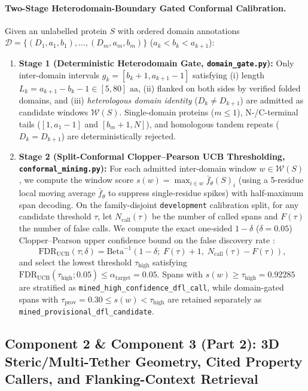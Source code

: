 \documentclass[11pt]{article}
\begin{document}
\paragraph{Two-Stage Heterodomain-Boundary Gated Conformal Calibration.}
Given an unlabelled protein $S$ with ordered domain annotations $\mathcal{D} = \{(D_1, a_1, b_1), \dots, (D_m, a_m, b_m)\}$ ($a_k < b_k < a_{k+1}$):
\begin{enumerate}
  \item \textbf{Stage 1 (Deterministic Heterodomain Gate, \texttt{domain\_gate.py}):} Only inter-domain intervals $g_k = [b_k + 1, a_{k+1} - 1]$ satisfying (i) length $L_k = a_{k+1} - b_k - 1 \in [5, 80]\text{ aa}$, (ii) flanked on both sides by verified folded domains, and (iii) \emph{heterologous domain identity} ($D_k \neq D_{k+1}$) are admitted as candidate windows $\mathcal{W}(S)$. Single-domain proteins ($m \le 1$), N-/C-terminal tails ($[1, a_1-1]$ and $[b_m+1, N]$), and homologous tandem repeats ($D_k = D_{k+1}$) are deterministically rejected.
  \item \textbf{Stage 2 (Split-Conformal Clopper--Pearson UCB Thresholding, \texttt{conformal\_mining.py}):} For each admitted inter-domain window $w \in \mathcal{W}(S)$, we compute the window score $s(w) = \max_{i \in w} \bar{f}_\theta(S)_i$ (using a 5-residue local moving average $\bar{f}_\theta$ to suppress single-residue spikes) with half-maximum span decoding. On the family-disjoint \texttt{development} calibration split, for any candidate threshold $\tau$, let $N_{\text{call}}(\tau)$ be the number of called spans and $F(\tau)$ the number of false calls. We compute the exact one-sided $1-\delta$ ($\delta = 0.05$) Clopper--Pearson upper confidence bound on the false discovery rate \cite{bates2021rcps,geifman2017selective}:
  \begin{equation}
    \text{FDR}_{\text{UCB}}(\tau; \delta) = \text{Beta}^{-1}\!\left(1 - \delta;\; F(\tau) + 1,\; N_{\text{call}}(\tau) - F(\tau)\right),
  \end{equation}
  and select the lowest threshold $\tau_{\text{high}}$ satisfying $\text{FDR}_{\text{UCB}}(\tau_{\text{high}}; 0.05) \le \alpha_{\text{target}} = 0.05$. Spans with $s(w) \ge \tau_{\text{high}} = 0.92285$ are stratified as \texttt{mined\_high\_confidence\_dfl\_call}, while domain-gated spans with $\tau_{\text{prov}} = 0.30 \le s(w) < \tau_{\text{high}}$ are retained separately as \texttt{mined\_provisional\_dfl\_candidate}.
\end{enumerate}

\subsection{Component 2 & Component 3 (Part 2): 3D Steric/Multi-Tether Geometry, Cited Property Callers, and Flanking-Context Retrieval}
\label{sec:method_part2}
\end{document}
